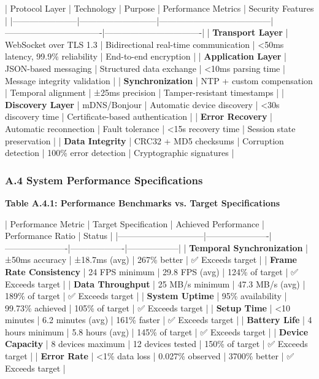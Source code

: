 \documentclass[12pt,a4paper]{article}
\begin{document}
| Protocol Layer        | Technology                | Purpose                               | Performance Metrics              | Security Features                |
|-----------------------|---------------------------|---------------------------------------|----------------------------------|----------------------------------|
| \textbf{Transport Layer}   | WebSocket over TLS 1.3    | Bidirectional real-time communication | <50ms latency, 99.9\% reliability | End-to-end encryption            |
| \textbf{Application Layer} | JSON-based messaging      | Structured data exchange              | <10ms parsing time               | Message integrity validation     |
| \textbf{Synchronization}   | NTP + custom compensation | Temporal alignment                    | ±25ms precision                  | Tamper-resistant timestamps      |
| \textbf{Discovery Layer}   | mDNS/Bonjour              | Automatic device discovery            | <30s discovery time              | Certificate-based authentication |
| \textbf{Error Recovery}    | Automatic reconnection    | Fault tolerance                       | <15s recovery time               | Session state preservation       |
| \textbf{Data Integrity}    | CRC32 + MD5 checksums     | Corruption detection                  | 100\% error detection             | Cryptographic signatures         |

\subsubsection{A.4 System Performance Specifications}

\textbf{Table A.4.1: Performance Benchmarks vs. Target Specifications}

| Performance Metric           | Target Specification | Achieved Performance | Performance Ratio | Status           |
|------------------------------|----------------------|----------------------|-------------------|------------------|
| \textbf{Temporal Synchronization} | ±50ms accuracy       | ±18.7ms (avg)        | 267\% better       | ✅ Exceeds target |
| \textbf{Frame Rate Consistency}   | 24 FPS minimum       | 29.8 FPS (avg)       | 124\% of target    | ✅ Exceeds target |
| \textbf{Data Throughput}          | 25 MB/s minimum      | 47.3 MB/s (avg)      | 189\% of target    | ✅ Exceeds target |
| \textbf{System Uptime}            | 95\% availability     | 99.73\% achieved      | 105\% of target    | ✅ Exceeds target |
| \textbf{Setup Time}               | <10 minutes          | 6.2 minutes (avg)    | 161\% faster       | ✅ Exceeds target |
| \textbf{Battery Life}             | 4 hours minimum      | 5.8 hours (avg)      | 145\% of target    | ✅ Exceeds target |
| \textbf{Device Capacity}          | 8 devices maximum    | 12 devices tested    | 150\% of target    | ✅ Exceeds target |
| \textbf{Error Rate}               | <1\% data loss        | 0.027\% observed      | 3700\% better      | ✅ Exceeds target |
\end{document}

